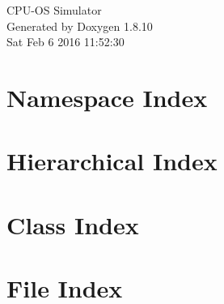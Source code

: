 \documentclass[twoside]{book}
\newcommand{\+}{\discretionary{\mbox{\scriptsize$\hookleftarrow$}}{}{}}
\newcommand{\clearemptydoublepage}{%
  \newpage{\pagestyle{empty}\cleardoublepage}%
}
\begin{document}
\hypersetup{pageanchor=false,
             bookmarks=true,
             bookmarksnumbered=true,
             pdfencoding=unicode
            }
\begin{titlepage}
\vspace*{7cm}
\begin{center}%
{\Large C\+P\+U-\/\+O\+S Simulator }\\
\vspace*{1cm}
{\large Generated by Doxygen 1.8.10}\\
\vspace*{0.5cm}
{\small Sat Feb 6 2016 11:52:30}\\
\end{center}
\end{titlepage}
\clearemptydoublepage
\tableofcontents
\clearemptydoublepage
{}
\hypersetup{pageanchor=true}

\chapter{Namespace Index}

\chapter{Hierarchical Index}

\chapter{Class Index}

\chapter{File Index}

\end{document}
